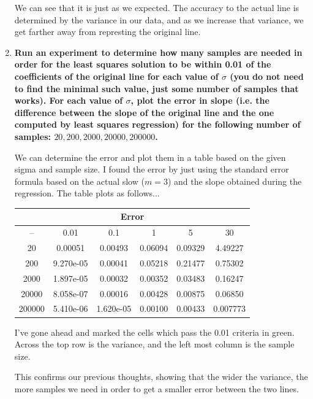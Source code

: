 \documentclass[11pt]{article}
\begin{document}
\begin{enumerate}
\begin{center}
            \end{center}
            We can see that it is just as we expected. The accuracy to the
            actual line is determined by the variance in our data, and as we
            increase that variance, we get farther away from represting the
            original line.
        \item \textbf{Run an experiment to determine how many samples are needed in order 
            for the least squares solution to be within 0.01 of the coefficients 
            of the original line for each value of $\sigma$ (you do not need to find the
            minimal such value, just some number of samples that works). For each 
            value of $\sigma$, plot the error in slope (i.e. the difference between the 
            slope of the original line and the one computed by least squares
            regression) for the following number of samples:
            $20,200,2000,20000,200000$.}

            We can determine the error and plot them in a table based on the
            given sigma and sample size. I found the error by just using the
            standard error formula based on the actual slow ($m=3$) and the
            slope obtained during the regression. The table plots as follows...

            \begin{center}
                \begin{tabular}{||c||c|c|c|c|c||}
                    \hline
                    \multicolumn{6}{||c||}{Error} \\
                    \hline
                    \hline
                    --	&	0.01	&	0.1	&	1	&	5	&	30 \\
                    \hline\hline
                    20	    &	\cellcolor{green}0.00051 	& \cellcolor{green}0.00493  & 0.06094    &	0.09329    & 4.49227\\
                    200	    &	9.270e-05	&	0.00041  & 0.05218    &	0.21477    & 0.75302\\
                    2000	&	1.897e-05	&	0.00032  & \cellcolor{green}0.00352    &	0.03483    & 0.16247 \\
                    20000	&	8.058e-07	&	0.00016  & 0.00428    & \cellcolor{green}0.00875    & 0.06850\\
                    200000	&	5.410e-06	&	1.620e-05& 0.00100	  &	0.00433 & \cellcolor{green}0.007773 \\
                    \hline
                \end{tabular}
            \end{center}
            I've gone ahead and marked the cells which pass the 0.01 criteria
            in green. Across the top row is the variance, and the left most
            column is the sample size.

            This confirms our previous thoughts, showing that the wider the
            variance, the more samples we need in order to get a smaller error
            between the two lines. 
    \end{enumerate}
\end{document}
